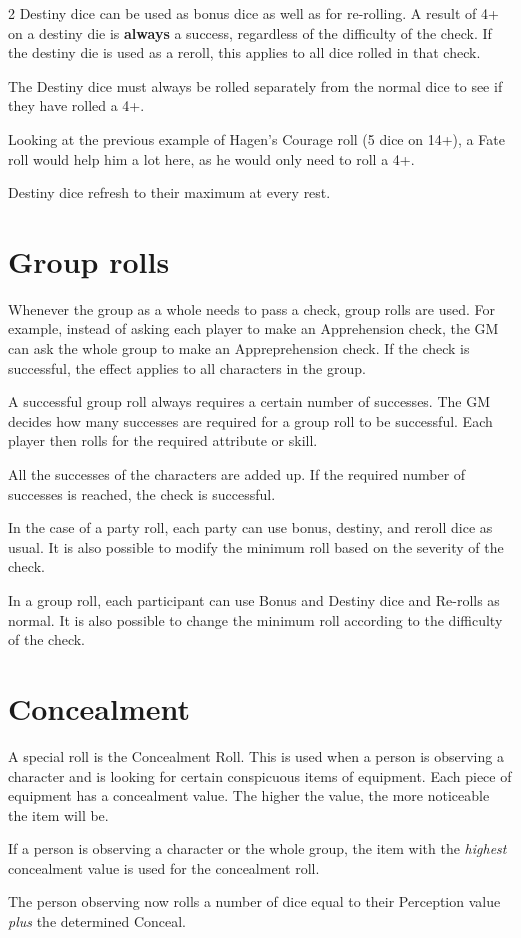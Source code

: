 \begin{multicols}{2}
Destiny dice can be used as bonus dice as well as for re-rolling. A result of 4+ on a destiny die is \textbf{always} a success, regardless of the difficulty of the check. If the destiny die is used as a reroll, this applies to all dice rolled in that check.

The Destiny dice must always be rolled separately from the normal dice to see if they have rolled a 4+.

\begin{pexample}[Example]
Looking at the previous example of Hagen's Courage roll (5 dice on 14+), a Fate roll would help him a lot here, as he would only need to roll a 4+.
\end{pexample}

Destiny dice refresh to their maximum at every rest.

\section{Group rolls}

Whenever the group as a whole needs to pass a check, group rolls are used. For example, instead of asking each player to make an Apprehension check, the GM can ask the whole group to make an Appreprehension check. If the check is successful, the effect applies to all characters in the group.

A successful group roll always requires a certain number of successes. The GM decides how many successes are required for a group roll to be successful. Each player then rolls for the required attribute or skill.

All the successes of the characters are added up. If the required number of successes is reached, the check is successful.

In the case of a party roll, each party can use bonus, destiny, and reroll dice as usual. It is also possible to modify the minimum roll based on the severity of the check.

In a group roll, each participant can use Bonus and Destiny dice and Re-rolls as normal. It is also possible to change the minimum roll according to the difficulty of the check.

\section{Concealment}

A special roll is the Concealment Roll. This is used when a person is observing a character and is looking for certain conspicuous items of equipment. Each piece of equipment has a concealment value. The higher the value, the more noticeable the item will be.

If a person is observing a character or the whole group, the item with the \textit{highest} concealment value is used for the concealment roll.

The person observing now rolls a number of dice equal to their Perception value \textit{plus} the determined Conceal.
\end{multicols}
